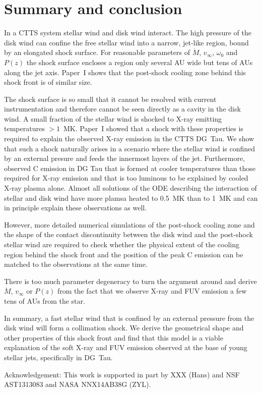 \section{Summary and conclusion}
\label{sect:conclusion}
In a CTTS system stellar wind and disk wind interact. The high pressure of the disk wind can confine the free stellar wind into a narrow, jet-like region, bound by an elongated shock surface. For reasonable parameters of $\dot M$, $v_\infty$, $\omega_0$ and $P(z)$ the shock surface encloses a region only several AU wide but tens of AUs along the jet axis. 
Paper~I shows that the post-shock cooling zone behind this shock front is of similar size.
 
The shock surface is so small that it cannot be resolved with current instrumentation and therefore cannot be seen directly as a cavity in the disk wind. A small fraction of the stellar wind is shocked to X-ray emitting temperatures $>1$~MK. 
Paper~I showed that a shock with these properties is required to explain the observed X-ray emission in the CTTS DG~Tau. We show that such a shock naturally arises in a scenario where the stellar wind is confined by an external presure and feeds the innermost layers of the jet.
Furthermore, \citet{2013A&A...550L...1S} observed C emission in DG Tau that is formed at cooler temperatures than those required for X-ray emission and that is too luminous to be explained by cooled X-ray plasma alone. Almost all solutions of the ODE describing the interaction of stellar and disk wind have more plamsa heated to 0.5~MK than to 1~MK and can in principle explain these observations as well.

However, more detailed numerical simulations of the post-shock cooling zone and the shape of the contact discontinuity between the disk wind and the post-shock stellar wind are required to check whether the physical extent of the cooling region behind the shock front and the position of the peak  C emission can be matched to the observations at the same time.

There is too much parameter degeneracy to turn the argument around and derive $\dot M$, $v_\infty$ or $P(z)$ from the fact that we observe X-ray and FUV emission a few tens of AUs from the star.

In summary, a fast stellar wind that is confined by an external pressure from the disk wind will form a collimation shock. We derive the geometrical shape and other properties of this shock front and find that this model is a viable explanation of the soft X-ray and FUV emission observed at the base of young stellar jets, specifically in DG~Tau.

Acknowledgement: This work is supported in part by XXX (Hans) and NSF AST1313083 and NASA NNX14AB38G (ZYL).

